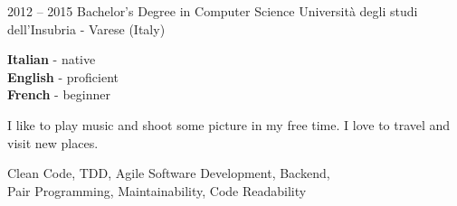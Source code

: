 \documentclass[9pt]{developercv} %
\begin{document}


\begin{entrylist}
	\entry
		{2012 -- 2015}
		{Bachelor's Degree in Computer Science}
		{Università degli studi dell'Insubria - Varese (Italy)}
		{}
\end{entrylist}


\begin{minipage}[t]{0.3\textwidth}
	\vspace{-\baselineskip} %


	\textbf{Italian} - native\\
	\textbf{English} - proficient\\
	\textbf{French} - beginner
\end{minipage}
\hfill
\begin{minipage}[t]{0.3\textwidth}
	\vspace{-\baselineskip} %


	I like to play music and shoot some picture in my free time. I love to travel and visit new places.
\end{minipage}
\hfill
\begin{minipage}[t]{0.3\textwidth}
	\vspace{-\baselineskip} %


	Clean Code, TDD, Agile Software Development, Backend,\\
	Pair Programming, Maintainability, Code Readability
\end{minipage}

\end{document}
